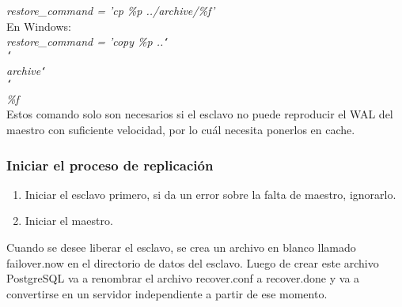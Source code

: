 \begin{enumerate}
\textit{restore\_command = 'cp \%p ../archive/\%f'}\\

En Windows:\\

\textit{restore\_command = 'copy \%p ..{\tt\char`\\}{\tt\char`\\}archive{\tt\char`\\}{\tt\char`\\}\%f}\\

Estos comando solo son necesarios si el esclavo no puede reproducir el WAL del maestro con suficiente velocidad, por lo cuál necesita ponerlos en cache.
\end{enumerate}

\subsubsection{Iniciar el proceso de replicación}

\begin{enumerate}
\item Iniciar el esclavo primero, si da un error sobre la falta de maestro, ignorarlo.
\item Iniciar el maestro.
\end{enumerate}

Cuando se desee liberar el esclavo, se crea un archivo en blanco llamado failover.now en el directorio de datos del esclavo. Luego de crear este archivo  PostgreSQL va a renombrar el archivo recover.conf  a recover.done y va a convertirse en un servidor independiente a partir de ese momento.

